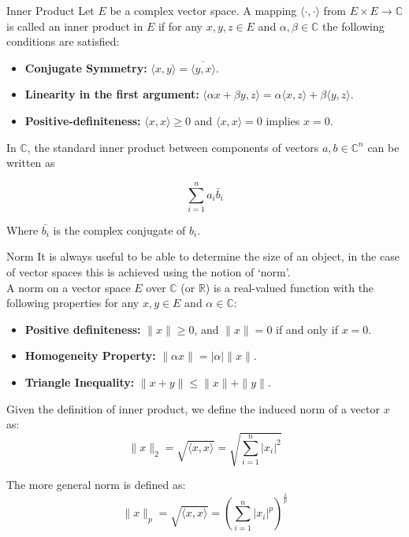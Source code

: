 \begin{definitionbox}{Inner Product}
Let \( E \) be a complex vector space. A mapping \( \langle \cdot, \cdot \rangle \) from \( E \times E \rightarrow \mathbb{C} \) is called an inner product in \( E \) if for any \( x, y, z \in E \) and \( \alpha, \beta \in \mathbb{C} \) the following conditions are satisfied:
\begin{itemize}
    \item \textbf{Conjugate Symmetry:} \( \langle x, y \rangle = \overline{\langle y, x \rangle} \).
    \item \textbf{Linearity in the first argument:} \( \langle \alpha x + \beta y, z \rangle = \alpha \langle x, z \rangle + \beta \langle y, z \rangle \).
    \item \textbf{Positive-definiteness:} \( \langle x, x \rangle \geq 0 \) and \( \langle x, x \rangle = 0 \) implies \( x = 0 \).
\end{itemize}

In $\mathbb{C}$, the standard inner product between components of vectors $a, b \in \mathbb{C}^n$ can be written as 

\begin{equation}
\sum^n_{i=1}a_i \bar{b}_i    
\end{equation}

Where $\bar{b_i}$ is the complex conjugate of $b_i$.

\end{definitionbox}

\begin{definitionbox}{Norm}
It is always useful to be able to determine the size of an object, in the case of vector spaces this is achieved using the notion of ‘norm’.\\ 
A norm on a vector space \( E \) over \( \mathbb{C} \) (or \( \mathbb{R} \)) is a real-valued function with the following properties for any \( x, y \in E \) and \( \alpha \in \mathbb{C} \):
\begin{itemize}
    \item \textbf{Positive definiteness:} \( \|x\| \geq 0 \), and \( \|x\| = 0 \) if and only if \( x = 0 \).
    \item \textbf{Homogeneity Property:} \( \|\alpha x\| = |\alpha| \|x\| \).
    \item \textbf{Triangle Inequality:} \( \|x + y\| \leq \|x\| + \|y\| \).
\end{itemize}
Given the definition of inner product, we define the induced norm of a vector \( x \) as:
\[ \|x\|_2 = \sqrt{\langle x, x \rangle}  = \sqrt{\sum^n_{i=1}|x_i|^2}\]

The more general norm is defined as:
\[ \|x\|_p = \sqrt{\langle x, x \rangle}  = \left(\sum^n_{i=1}|x_i|^p\right) ^{\frac{1}{p}}\]

\end{definitionbox}


